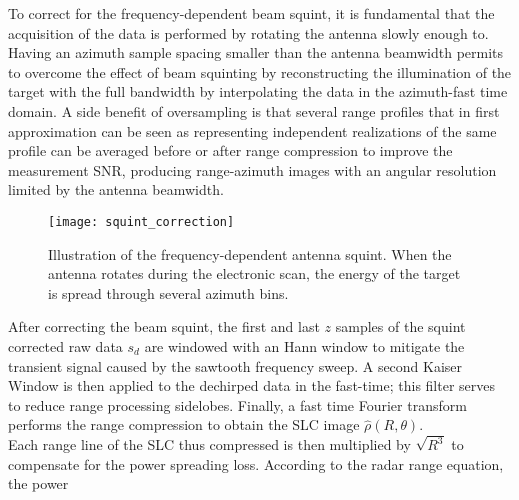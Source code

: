 To correct for the frequency-dependent beam squint, it is fundamental that the acquisition of the data is performed by rotating the antenna slowly enough to. Having an azimuth sample spacing smaller than the antenna beamwidth permits to overcome the effect of beam squinting by reconstructing the illumination of the target with the full bandwidth by interpolating the data in the azimuth-fast time domain. A side benefit of oversampling is that several range profiles that in first approximation can be seen as representing independent realizations of the same profile can be averaged before or after range compression to improve the measurement SNR, producing range-azimuth images with an angular resolution limited by the antenna beamwidth.\\
\begin{figure}[ht]
	\centering
	\texttt{[image: squint\_correction]}
	\caption{Illustration of the frequency-dependent antenna squint. When the antenna rotates during the electronic scan, the energy of the target is spread through several azimuth bins.}
	\label{fig:squint_correction}
\end{figure}
After correcting the beam squint,  the first and last $z$ samples of the squint corrected raw data $s_{d}$ are windowed with an Hann window to mitigate the transient signal caused by the sawtooth frequency sweep. A second Kaiser Window is then applied to the dechirped data in the fast-time; this filter serves to reduce range processing sidelobes. Finally, a fast time Fourier transform performs the range compression to obtain the SLC image $\hat{\rho}\left(R, \theta\right)$.\\ Each range line of the SLC thus compressed is then multiplied by $\sqrt{R^3}$ to compensate for the power spreading loss. According to the radar range equation, the power
